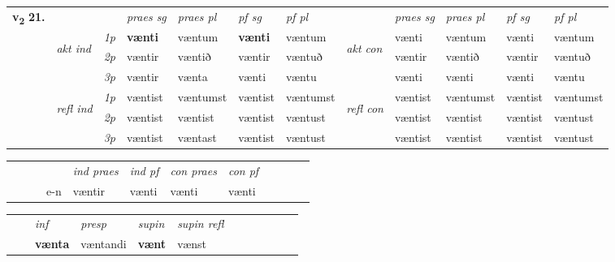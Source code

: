 \begin{tabular}{llllllllllll} \toprule
\multirow{4}{*}{{{\textbf{v{\textsubscript{2}}} \Large{\textbf{21.}}}}}  & &   &  \textit{praes sg}  & \textit{praes pl}  &\textit{ pf sg} & \textit{pf pl} &  &  \textit{praes sg}  & \textit{praes pl}  & \textit{pf sg} & \textit{pf pl } \\*
	\cmidrule{4-7} \cmidrule{9-12}
 & \multirow{3}{*}{\begin{turn}{90}\textit{akt ind}\end{turn}} & {\textit{1p}} & \textbf{vænti} & væntum    & \textbf{vænti} & væntum & \multirow{3}{*}{\begin{turn}{90}\textit{akt con}\end{turn}} &vænti & væntum & vænti & væntum\\*
& &  {\textit{2p}} &  væntir  & væntið   & væntir & væntuð & & væntir & væntið & væntir & væntuð \\*
& &  {\textit{3p}} & væntir & vænta   & vænti & væntu & & vænti & vænti& vænti & væntu  \\*
\cmidrule{4-7} \cmidrule{9-12}
 &\multirow{3}{*}{\begin{turn}{90}\textit{refl ind}\end{turn}} & {\textit{1p}} & væntist & væntumst    & væntist & væntumst & \multirow{3}{*}{\begin{turn}{90}\textit{refl con}\end{turn}}  &væntist & væntumst & væntist & væntumst\\*
 &&  {\textit{2p}} &  væntist  & væntist   & væntist & væntust & &væntist & væntist & væntist & væntust \\*
& &  {\textit{3p}} & væntist & væntast   & væntist & væntust & & væntist & væntist& væntist & væntust  \\*
\cmidrule{4-7} \cmidrule{9-12}
\end{tabular}


\begin{tabular}{llllllllllll}
 & &  & &  \textit{ind praes} & \textit{ind pf} & \textit{con praes} & \textit{con pf} \\*
&  & & e-n & væntir & vænti & vænti & vænti \\*
\cmidrule{5-9}
\end{tabular}


\begin{tabular}{llllllllllll}
 & & \textit{inf}     & \textit{presp} & \textit{supin} & \textit{supin refl}      \\*
  & & \textbf{vænta}      & væntandi &  \textbf{vænt} & vænst  \\*
\cmidrule{1-12}
\end{tabular}





